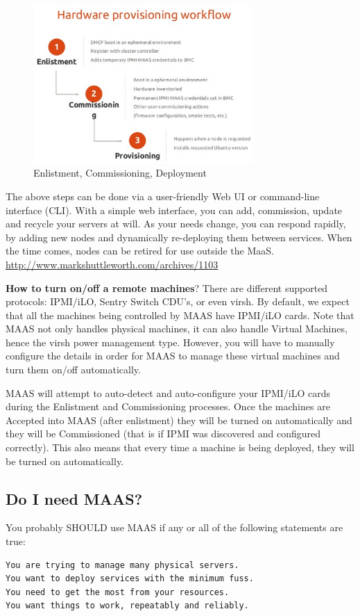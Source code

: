 \begin{figure}[hbt]
  \centerline{\includegraphics[height=6cm,
    angle=0]{./images/MaaS_workflow.eps}}
\caption{Enlistment, Commissioning, Deployment}
\label{fig:MaaS_workflow}
\end{figure}

The above steps can be done via a user-friendly Web UI or command-line interface
(CLI). With a simple web interface, you can  add, commission, update and recycle
your servers at will.  As your needs change, you can respond rapidly, by adding new
nodes and dynamically re-deploying them between services. When the time comes,
nodes can be retired for use outside the MaaS.  
\url{http://www.markshuttleworth.com/archives/1103}


{\bf How to turn on/off a remote machines}? There are different supported
protocols:  IPMI/iLO, Sentry Switch CDU's, or even virsh. 
By default, we expect that all the machines being controlled by MAAS have
IPMI/iLO cards. Note that MAAS not only handles physical machines, it can also handle Virtual
Machines, hence the virsh power management type. However, you will have to
manually configure the details in order for MAAS to manage these virtual
machines and turn them on/off automatically.

MAAS will attempt to auto-detect and auto-configure your IPMI/iLO cards during
the Enlistment and Commissioning processes. Once the machines are  Accepted into
MAAS (after enlistment) they will be turned on automatically and they will be
Commissioned  (that is if IPMI was discovered and configured correctly).
This also means that every time a machine is being deployed, they will be turned
on automatically.


\subsection{Do I need MAAS?}

You probably SHOULD use MAAS if any or all of the following statements are true:
\begin{verbatim}
You are trying to manage many physical servers.
You want to deploy services with the minimum fuss.
You need to get the most from your resources.
You want things to work, repeatably and reliably.
\end{verbatim}

